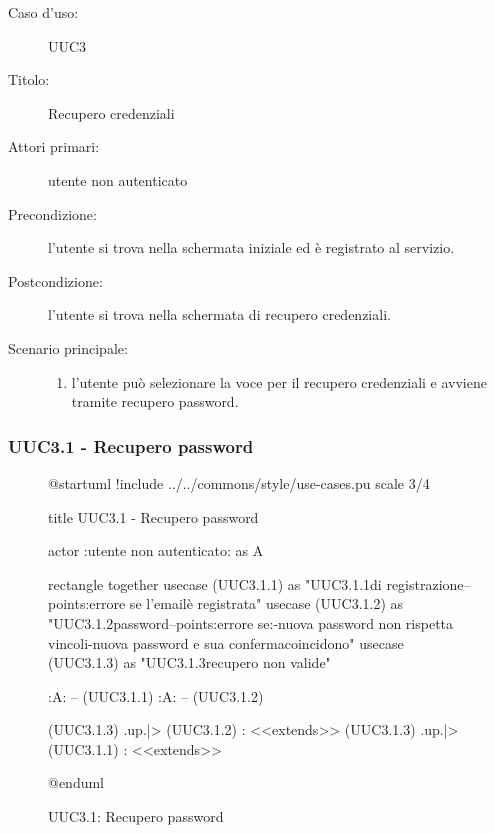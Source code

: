 \documentclass[casi-duso]{subfiles}
\begin{document}
\begin{description}
  \item[Caso d’uso:] UUC3
  \item[Titolo:] Recupero credenziali
  \item[Attori primari:] utente non autenticato
  \item[Precondizione:] l'utente si trova nella schermata iniziale ed è registrato al servizio.
  \item[Postcondizione:] l'utente si trova nella schermata di recupero credenziali.
  \item[Scenario principale:]
        \begin{enumerate}
          \item l'utente può selezionare la voce per il recupero credenziali e avviene tramite recupero password.
        \end{enumerate}
\end{description}

\subsubsection{UUC3.1 - Recupero password}%
\label{subsub:UUC3.1utente}

\begin{figure}[h!] 
  \centering 
  \begin{plantuml}
  @startuml
  !include ../../commons/style/use-cases.pu
  scale 3/4

  title UUC3.1 - Recupero password

  actor :utente non autenticato: as A

  rectangle {
    together {
      usecase (UUC3.1.1) as "UUC3.1.1\nInserimento\nemail di registrazione\n--\nExtension points:\nVisualizzazione errore se l'email\nnon è registrata"
      usecase (UUC3.1.2) as "UUC3.1.2\nReimpostazione password\n--\nExtension points:\nVisualizzazione errore se:\n-nuova password non rispetta vincoli\n-nuova password e sua conferma\nnon coincidono"  
      usecase (UUC3.1.3) as "UUC3.1.3\nInformazioni recupero non valide" 
    }
  }

  :A: -- (UUC3.1.1)
  :A: -- (UUC3.1.2)

  (UUC3.1.3) .up.|> (UUC3.1.2) : <<extends>>
  (UUC3.1.3) .up.|> (UUC3.1.1) : <<extends>>

  @enduml  
  \end{plantuml} 
  \caption{UUC3.1: Recupero password} 
  \label{fig:uuc3_1} 
\end{figure}
\end{document}
